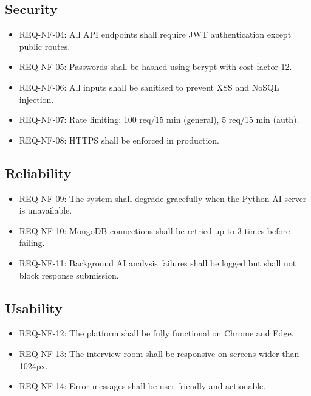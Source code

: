 \subsection*{Security}
\begin{itemize}
  \item REQ-NF-04: All API endpoints shall require JWT authentication except public routes.
  \item REQ-NF-05: Passwords shall be hashed using bcrypt with cost factor 12.
  \item REQ-NF-06: All inputs shall be sanitised to prevent XSS and NoSQL injection.
  \item REQ-NF-07: Rate limiting: 100 req/15 min (general), 5 req/15 min (auth).
  \item REQ-NF-08: HTTPS shall be enforced in production.
\end{itemize}

\subsection*{Reliability}
\begin{itemize}
  \item REQ-NF-09: The system shall degrade gracefully when the Python AI server is unavailable.
  \item REQ-NF-10: MongoDB connections shall be retried up to 3 times before failing.
  \item REQ-NF-11: Background AI analysis failures shall be logged but shall not block response submission.
\end{itemize}

\subsection*{Usability}
\begin{itemize}
  \item REQ-NF-12: The platform shall be fully functional on Chrome and Edge.
  \item REQ-NF-13: The interview room shall be responsive on screens wider than 1024px.
  \item REQ-NF-14: Error messages shall be user-friendly and actionable.
\end{itemize}
